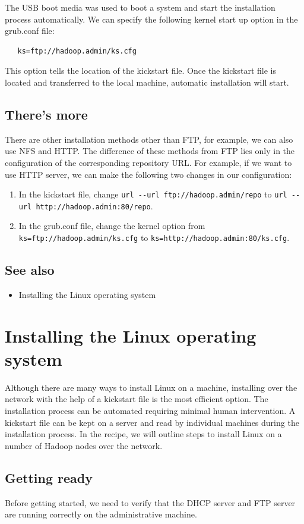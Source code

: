 The USB boot media was used to boot a system and start the installation process automatically. We can specify the following kernel start up option in the grub.conf file:
\begin{verbatim}
   ks=ftp://hadoop.admin/ks.cfg
\end{verbatim}
This option tells the location of the kickstart file. Once the kickstart file is located and transferred to the local machine, automatic installation will start.
\subsection*{There's more}
There are other installation methods other than FTP, for example, we can also use NFS and HTTP. The difference of these methods from FTP lies only in the configuration of the corresponding repository URL. For example, if we want to use HTTP server, we can make the following two changes in our configuration:
\begin{enumerate}
  \item In the kickstart file, change \verb|url --url ftp://hadoop.admin/repo| to \verb|url --url http://hadoop.admin:80/repo|.
  \item In the grub.conf file, change the kernel option from \verb|ks=ftp://hadoop.admin/ks.cfg| to \verb|ks=http://hadoop.admin:80/ks.cfg|.
\end{enumerate}
\subsection*{See also}
\begin{itemize}
  \item Installing the Linux operating system
\end{itemize}
\section{Installing the Linux operating system}
Although there are many ways to install Linux on a machine, installing over the network with the help of a kickstart file is the most efficient option. The installation process can be automated requiring minimal human intervention. A kickstart file can be kept on a server and read by individual machines during the installation process. In the recipe, we will outline steps to install Linux on a number of Hadoop nodes over the network.
\subsection*{Getting ready}
Before getting started, we need to verify that the DHCP server and FTP server are running correctly on the administrative machine.


